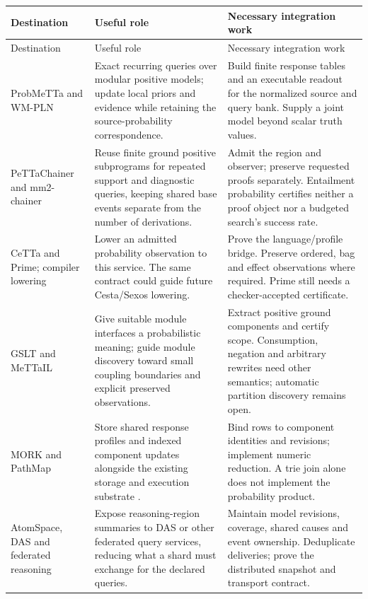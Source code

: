 \documentclass[11pt,a4paper]{article}
\begin{document}
\begingroup\small
\renewcommand{\arraystretch}{1.12}
\begin{longtable}{@{}P{.18\textwidth}P{.37\textwidth}P{.37\textwidth}@{}}
\toprule
Destination & Useful role & Necessary integration work \\
\midrule
\endfirsthead
\toprule Destination & Useful role & Necessary integration work \\
\midrule
\endhead
\bottomrule
\endfoot
ProbMeTTa and WM-PLN &
Exact recurring queries over modular positive models; update local priors and
evidence while retaining the source-probability correspondence. &
Build finite response tables and an executable readout for the normalized
source and query bank. Supply a joint model beyond scalar truth values.
\\[5pt]
PeTTaChainer and mm2-chainer &
Reuse finite ground positive subprograms for repeated support and diagnostic
queries, keeping shared base events separate from the number of derivations. &
Admit the region and observer; preserve requested proofs separately.
Entailment probability certifies neither a proof object nor a budgeted
search's success rate.
\\[5pt]
CeTTa and Prime; compiler lowering &
Lower an admitted probability observation to this service. The same contract
could guide future Cesta/Sexos lowering. &
Prove the language/profile bridge. Preserve ordered, bag and effect observations
where required. Prime still needs a checker-accepted certificate.
\\[5pt]
GSLT and MeTTaIL &
Give suitable module interfaces a probabilistic meaning; guide module
discovery toward small coupling boundaries and explicit preserved observations. &
Extract positive ground components and certify scope. Consumption, negation
and arbitrary rewrites need other semantics; automatic partition discovery
remains open.
\\[5pt]
MORK and PathMap &
Store shared response profiles and indexed component updates alongside the
existing storage and execution substrate \cite{mork,pathmap}. &
Bind rows to component identities and revisions; implement numeric reduction.
A trie join alone does not implement the probability product.
\\[5pt]
AtomSpace, DAS and federated reasoning &
Expose reasoning-region summaries to DAS \cite{das} or other federated query
services, reducing what a shard must exchange for the declared queries. &
Maintain model revisions, coverage, shared causes and event ownership.
Deduplicate deliveries; prove the distributed snapshot and transport contract.

\end{longtable}
\end{document}
